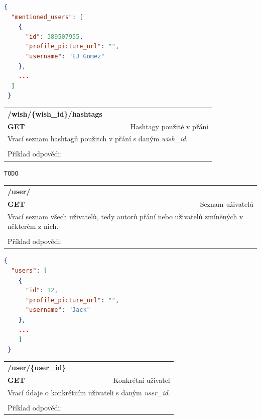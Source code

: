 \documentclass[thesis=B,czech]{FITthesis}[2012/06/26]
\begin{document}
\begin{lstlisting}[language=json,firstnumber=1]
 {
  "mentioned_users": [
    {
      "id": 389507955,
      "profile_picture_url": "",
      "username": "EJ Gomez"
    },
    ...
  ]
 }
\end{lstlisting} 

\begin{table}[h]
\begin{tabular}{llllr}
\rowcolor[HTML]{EFEFEF}
\large \textbf{/wish/\{wish\_id\}/hashtags}        &         &                 &        & \multicolumn{1}{l}{}                \\
\rowcolor[HTML]{EFEFEF}
\textbf{GET}          &         &                 &        & Hashtagy použité v přání                        \\
\multicolumn{5}{l}{\parbox[t]{12.8cm}{Vrací seznam hashtagů použitch v přání s daným \textit{wish\_id}.}  } \\   
 & & & & \\
 Příklad odpovědi: 
\end{tabular}
\end{table}

\begin{lstlisting}
TODO
\end{lstlisting} 

\begin{table}[h]
\begin{tabular}{llllr}
\rowcolor[HTML]{EFEFEF}
\large \textbf{/user/}        &         &                 &        & \multicolumn{1}{l}{}                \\
\rowcolor[HTML]{EFEFEF}
\textbf{GET}          &         &                 &        & Seznam uživatelů                        \\
\multicolumn{5}{l}{\parbox[t]{12.8cm}{Vrací seznam všech uživatelů, tedy autorů přání nebo uživatelů zmíněných v některém z nich. }  } \\   
 & & & & \\
 Příklad odpovědi:
\end{tabular}
\end{table}

\begin{lstlisting}[language=json,firstnumber=1]
 {
  "users": [
    {
      "id": 12,
      "profile_picture_url": "",
      "username": "Jack"
    },
    ...
    ]
 }
\end{lstlisting} 

\begin{table}[h]
\begin{tabular}{llllr}
\rowcolor[HTML]{EFEFEF}
\large \textbf{/user/\{user\_id\}}        &         &                 &        & \multicolumn{1}{l}{}                \\
\rowcolor[HTML]{EFEFEF}
\textbf{GET}          &         &                 &        & Konkrétní uživatel                        \\
\multicolumn{5}{l}{\parbox[t]{12.8cm}{Vrací údaje o konkrétním uživateli s daným \textit{user\_id}. }  } \\  
 & & & & \\
 Příklad odpovědi:
\end{tabular}
\end{table}
\end{document}

